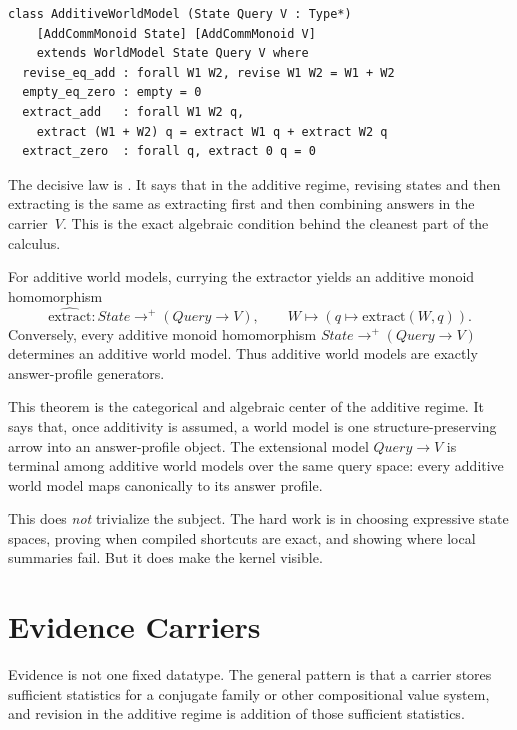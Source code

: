 \documentclass[11pt,openany]{report}
\begin{document}
\begin{lstlisting}[language={}]
class AdditiveWorldModel (State Query V : Type*)
    [AddCommMonoid State] [AddCommMonoid V]
    extends WorldModel State Query V where
  revise_eq_add : forall W1 W2, revise W1 W2 = W1 + W2
  empty_eq_zero : empty = 0
  extract_add   : forall W1 W2 q,
    extract (W1 + W2) q = extract W1 q + extract W2 q
  extract_zero  : forall q, extract 0 q = 0
\end{lstlisting}

The decisive law is .  It says that in the additive regime,
revising states and then extracting is the same as extracting first and then
combining answers in the carrier~$V$.  This is the exact algebraic condition
behind the cleanest part of the calculus.

\begin{theorem}
\label{thm:overview-profile-hom}
For additive world models, currying the extractor yields an additive monoid
homomorphism
\[
  \widehat{\mathrm{extract}} : \textit{State} \to^+ (\textit{Query} \to V),
  \qquad
  W \mapsto (q \mapsto \mathrm{extract}(W,q)).
\]
Conversely, every additive monoid homomorphism
\(\textit{State} \to^+ (\textit{Query} \to V)\) determines an additive world
model.  Thus additive world models are exactly answer-profile generators.
\end{theorem}

This theorem is the categorical and algebraic center of the additive regime.
It says that, once additivity is assumed, a world model is one
structure-preserving arrow into an answer-profile object.  The extensional
model \(\textit{Query} \to V\) is terminal among additive world models over the
same query space: every additive world model maps canonically to its answer
profile.

This does \emph{not} trivialize the subject.  The hard work is in choosing
expressive state spaces, proving when compiled shortcuts are exact, and
showing where local summaries fail.  But it does make the kernel visible.

\section{Evidence Carriers}
\label{sec:overview-carriers}

Evidence is not one fixed datatype.  The general pattern is that a carrier
stores sufficient statistics for a conjugate family or other compositional value
system, and revision in the additive regime is addition of those sufficient
statistics.
\end{document}
